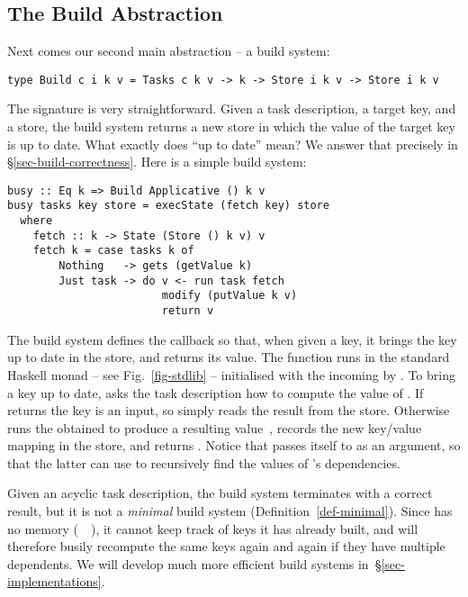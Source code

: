 \subsection{The Build Abstraction}\label{sec-general-build}

Next comes our second main abstraction -- a build system:

\vspace{1mm}
\begin{verbatim}
type Build c i k v = Tasks c k v -> k -> Store i k v -> Store i k v
\end{verbatim}
\vspace{1mm}

\noindent
The signature is very straightforward. Given a task description, a target key,
and a store, the build system returns a new store in which the value of the
target key is up to date. What exactly does ``up to date'' mean?  We answer
that precisely in \S\ref{sec-build-correctness}. Here is a simple build system:

\vspace{1mm}
\begin{verbatim}
busy :: Eq k => Build Applicative () k v
busy tasks key store = execState (fetch key) store
  where
    fetch :: k -> State (Store () k v) v
    fetch k = case tasks k of
        Nothing   -> gets (getValue k)
        Just task -> do v <- run task fetch
                        modify (putValue k v)
                        return v
\end{verbatim}
\vspace{1mm}

\noindent
The  build system defines the callback  so that, when given a
key, it brings the key up to date in the store, and returns its value.
The function  runs in the standard Haskell  monad -- see
Fig.~\ref{fig-stdlib} -- initialised with the incoming  by .
To bring a key up to date,  asks the task description  how
to compute the value of . If  returns  the key is an
input, so  simply reads the result from the store. Otherwise 
runs the obtained  to produce a resulting value~, records the new
key/value mapping in the store, and returns . Notice that 
passes itself to  as an argument, so that the latter can use 
to recursively find the values of 's dependencies.

Given an acyclic task description, the  build system terminates with a
correct result, but it is not a \emph{minimal} build system
(Definition~\ref{def-minimal}). Since  has no memory
(~\hs{=}~\hs{()}), it cannot keep track of keys it has already built, and
will therefore busily recompute the same keys again and again if they have
multiple dependents. We will develop much more efficient build systems
in~\S\ref{sec-implementations}.

